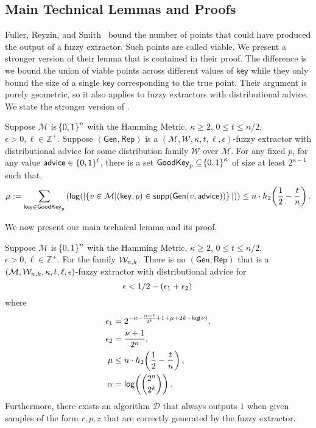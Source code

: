 \subsection{Main Technical Lemmas and Proofs}
\label{ssec:proof overview}





Fuller, Reyzin, and Smith~\cite{fuller2016fuzzy,fuller2020fuzzy} bound the number of points that could have produced the output of a fuzzy extractor.  Such points are called viable.  We present a stronger version of their lemma that is contained in their proof.  The difference is we bound the union of viable points across different values of $\mathsf{key}$ while they only bound the size of a single $\mathsf{key}$ corresponding to the true point.  Their argument is purely geometric, so it also applies to fuzzy extractors with distributional advice. 
We state the stronger version of \cite[Lemma 5.2]{fuller2020fuzzy}.

\begin{lemma}
    \label{lem:smallgeneralviable}
    Suppose $\mathcal{M}$ is $\!\left\{ 0,1 \right\}^{n}$ with the Hamming Metric, $\kappa \geq 2$, $0 \leq t \leq n/2$, $\epsilon > 0, \ell\in\mathbb{Z}^+$. 
    Suppose $(\mathsf{Gen, Rep})$ is a $(\mathcal{M,W},\kappa, t, \ell, \epsilon)$-fuzzy extractor with distributional advice for some distribution family $\mathcal{W}$ over $\mathcal{M}$. 
    For any fixed $p$, for any value ${\mathsf{advice}} \in \{0, 1\}^\ell$, there is a set $\mathsf{GoodKey}_p \subseteq \!\left\{ 0,1 \right\}^{\kappa}$ of size at least $2^{\kappa - 1}$ such that,
    \[
      \mu:= \sum_{\mathsf{key} \in \mathsf{GoodKey}_p} \left( \mathsf{log}\!\left(|\!\left\{ v \in \mathcal{M}|\!\left(\mathsf{key}, p\right) \in \mathsf{supp}\!\left(\mathsf{Gen}(v, {\mathsf{advice}})\right) \right\}|\right)\right) \leq n \cdot h_2\!\left(\frac{1}{2} - \frac{t}{n}\right).
    \]   
\end{lemma}

\noindent
We now present our main technical lemma and its proof. 
\begin{lemma}
\label{lem:convert distinguisher}
    Suppose $\mathcal{M}$ is $\!\left\{ 0,1 \right\}^{n}$ with the Hamming Metric, $\kappa \geq 2$, $0 \leq t \leq n/2$, $\epsilon > 0, \ell\in\mathbb{Z}^+$. For the family $\mathcal{W}_{n,k}$.
    There is no $(\mathsf{Gen, Rep})$ that is a $(\mathcal{M},\mathcal{W}_{n,k},\kappa, t, \ell, \epsilon)$-fuzzy extractor with distributional advice for
\[
\epsilon<1/2-\left(\epsilon_1+\epsilon_2\right)\\
\]
where 
\begin{align*}
\epsilon_1&= 2^{-\kappa-\frac{\alpha-\ell}{2^k}+1+\mu+2k-\mathsf{log}\!\left(\nu\right)},\\
\epsilon_2&=\frac{\nu+1}{2^{\kappa}},\\
  \mu &\leq n \cdot h_2\!\left(\frac{1}{2} - \frac{t}{n}\right),\\
\alpha &= \mathsf{log}\!\left({2^n\choose 2^k}\right).
\end{align*}
Furthermore, there exists an algorithm $\mathcal{D}$ that always outputs $1$ when given samples of the form $r, p, z$ that are correctly generated by the fuzzy extractor.
\end{lemma}

